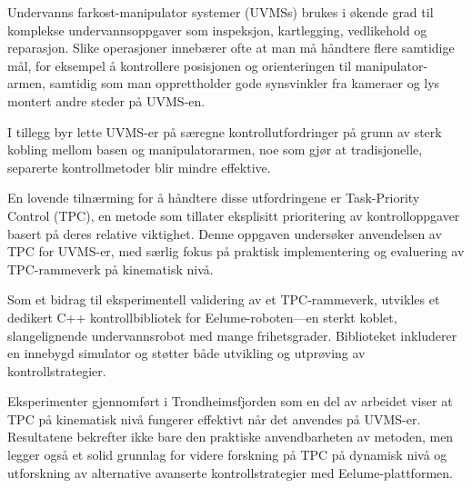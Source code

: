 Undervanns farkost-manipulator systemer (UVMSs) brukes i økende grad til komplekse undervannsoppgaver som inspeksjon, kartlegging, vedlikehold og reparasjon. Slike operasjoner innebærer ofte at man må håndtere flere samtidige mål, for eksempel å kontrollere posisjonen og orienteringen til manipulator-armen, samtidig som man opprettholder gode synsvinkler fra kameraer og lys montert andre steder på UVMS-en.

I tillegg byr lette UVMS-er på særegne kontrollutfordringer på grunn av sterk kobling mellom basen og manipulatorarmen, noe som gjør at tradisjonelle, separerte kontrollmetoder blir mindre effektive.

En lovende tilnærming for å håndtere disse utfordringene er Task-Priority Control (TPC), en metode som tillater eksplisitt prioritering av kontrolloppgaver basert på deres relative viktighet. Denne oppgaven undersøker anvendelsen av TPC for UVMS-er, med særlig fokus på praktisk implementering og evaluering av TPC-rammeverk på kinematisk nivå.

Som et bidrag til eksperimentell validering av et TPC-rammeverk, utvikles et dedikert C++ kontrollbibliotek for Eelume-roboten—en sterkt koblet, slangelignende undervannsrobot med mange frihetsgrader. Biblioteket inkluderer en innebygd simulator og støtter både utvikling og utprøving av kontrollstrategier.

Eksperimenter gjennomført i Trondheimsfjorden som en del av arbeidet viser at TPC på kinematisk nivå fungerer effektivt når det anvendes på UVMS-er. Resultatene bekrefter ikke bare den praktiske anvendbarheten av metoden, men legger også et solid grunnlag for videre forskning på TPC på dynamisk nivå og utforskning av alternative avanserte kontrollstrategier med Eelume-plattformen.
